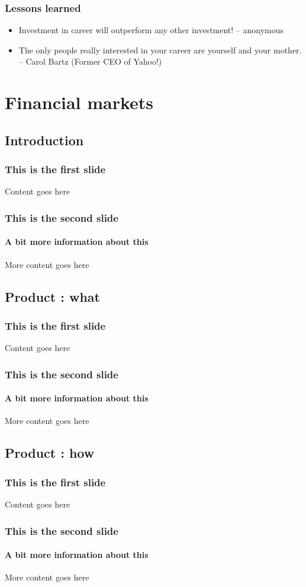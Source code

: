 \documentclass{beamer}
\begin{document}
\begin{frame}
  \frametitle{Lessons learned}
  \begin{itemize}
  \item<1-1> Investment in career will outperform any other investment! -- anonymous
  \item<2-2> The only people really interested in your career are yourself and your mother. -- Carol Bartz (Former CEO of Yahoo!)
  \end{itemize}
\end{frame}

\section{Financial markets}
\subsection{Introduction}
\begin{frame}
  \frametitle{This is the first slide}
  Content goes here
\end{frame}
\begin{frame}
  \frametitle{This is the second slide}
  \framesubtitle{A bit more information about this}
  More content goes here
\end{frame}
\subsection{Product : what}
\begin{frame}
  \frametitle{This is the first slide}
  Content goes here
\end{frame}
\begin{frame}
  \frametitle{This is the second slide}
  \framesubtitle{A bit more information about this}
  More content goes here
\end{frame}
\subsection{Product : how}
\begin{frame}
  \frametitle{This is the first slide}
  Content goes here
\end{frame}
\begin{frame}
  \frametitle{This is the second slide}
  \framesubtitle{A bit more information about this}
  More content goes here
\end{frame}
\end{document}
